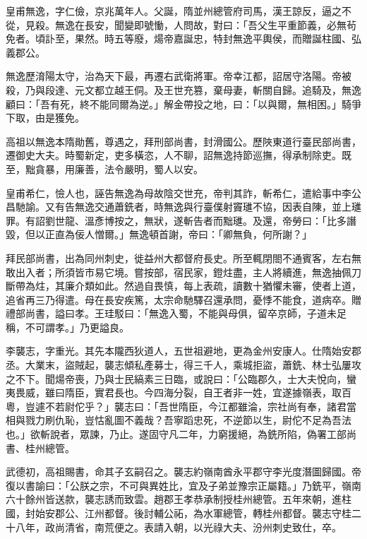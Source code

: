 \begin{pinyinscope}
 皇甫無逸，字仁儉，京兆萬年人。父誕，隋並州總管府司馬，漢王諒反，逼之不從，見殺。無逸在長安，聞變即號慟，人問故，對曰：「吾父生平重節義，必無茍免者。頃訃至，果然。時五等廢，煬帝嘉誕忠，特封無逸平輿侯，而贈誕柱國、弘義郡公。



 無逸歷淯陽太守，治為天下最，再遷右武衛將軍。帝幸江都，詔居守洛陽。帝被殺，乃與段達、元文都立越王侗。及王世充篡，棄母妻，斬關自歸。追騎及，無逸顧曰：「吾有死，終不能同爾為逆。」解金帶投之地，曰：「以與爾，無相困。」騎爭下取，由是獲免。



 高祖以無逸本隋勛舊，尊遇之，拜刑部尚書，封滑國公。歷陜東道行臺民部尚書，遷御史大夫。時蜀新定，吏多橫恣，人不聊，詔無逸持節巡撫，得承制除吏。既至，黜貪暴，用廉善，法令嚴明，蜀人以安。



 皇甫希仁，憸人也，誣告無逸為母故陰交世充，帝判其詐，斬希仁，遣給事中李公昌馳諭。又有告無逸交通蕭銑者，時無逸與行臺僕射竇璡不協，因表自陳，並上璡罪。有詔劉世龍、溫彥博按之，無狀，遂斬告者而黜璡。及還，帝勞曰：「比多譖毀，但以正直為佞人憎爾。」無逸頓首謝，帝曰：「卿無負，何所謝？」



 拜民部尚書，出為同州刺史，徙益州大都督府長史。所至輒閉閤不通賓客，左右無敢出入者；所須皆市易它境。嘗按部，宿民家，鐙炷盡，主人將續進，無逸抽佩刀斷帶為炷，其廉介類如此。然過自畏慎，每上表疏，讀數十猶懼未審，使者上道，追省再三乃得遣。母在長安疾篤，太宗命馳驛召還承問，憂悸不能食，道病卒。贈禮部尚書，謚曰孝。王珪駁曰：「無逸入蜀，不能與母俱，留卒京師，子道未足稱，不可謂孝。」乃更謚良。



 李襲志，字重光。其先本隴西狄道人，五世祖避地，更為金州安康人。仕隋始安郡丞。大業末，盜賊起，襲志傾私產募士，得三千人，乘城拒盜，蕭銑、林士弘屢攻之不下。聞煬帝喪，乃與士民縞素三日臨，或說曰：「公臨郡久，士大夫悅向，蠻夷畏威，雖曰隋臣，實君長也。今四海分裂，自王者非一姓，宜遂據嶺表，取百粵，豈遽不若尉佗乎？」襲志曰：「吾世隋臣，今江都雖淪，宗社尚有奉，諸君當相與戮力刷仇恥，豈怙亂圖不義哉？吾寧蹈忠死，不逆節以生，尉佗不足為吾法也。」欲斬說者，眾諫，乃止。遂固守凡二年，力窮援絕，為銑所陷，偽署工部尚書、桂州總管。



 武德初，高祖賜書，命其子玄嗣召之。襲志約嶺南酋永平郡守李光度潛圖歸國。帝復以書諭曰：「公朕之宗，不可與異姓比，宜及子弟並豫宗正屬籍。」乃銑平，嶺南六十餘州皆送款，襲志誘而致雲。趙郡王孝恭承制授桂州總管。五年來朝，進柱國，封始安郡公、江州都督。後討輔公祏，為水軍總管，轉桂州都督。襲志守桂二十八年，政尚清省，南荒便之。表請入朝，以光祿大夫、汾州刺史致仕，卒。




\end{pinyinscope}
